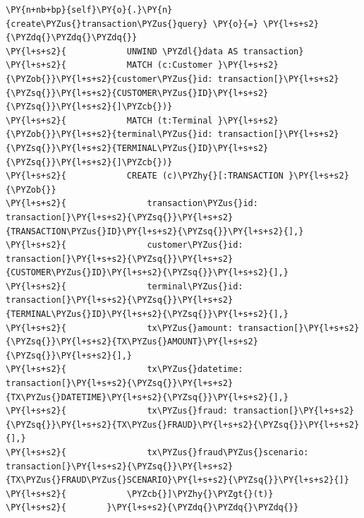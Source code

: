\begin{tcolorbox}[breakable, size=fbox, boxrule=1pt, pad at break*=1mm,colback=cellbackground, colframe=cellborder]
\begin{Verbatim}[commandchars=\\\{\}]
        \PY{n+nb+bp}{self}\PY{o}{.}\PY{n}{create\PYZus{}transaction\PYZus{}query} \PY{o}{=} \PY{l+s+s2}{\PYZdq{}\PYZdq{}\PYZdq{}}
\PY{l+s+s2}{            UNWIND \PYZdl{}data AS transaction}
\PY{l+s+s2}{            MATCH (c:Customer }\PY{l+s+s2}{\PYZob{}}\PY{l+s+s2}{customer\PYZus{}id: transaction[}\PY{l+s+s2}{\PYZsq{}}\PY{l+s+s2}{CUSTOMER\PYZus{}ID}\PY{l+s+s2}{\PYZsq{}}\PY{l+s+s2}{]\PYZcb{})}
\PY{l+s+s2}{            MATCH (t:Terminal }\PY{l+s+s2}{\PYZob{}}\PY{l+s+s2}{terminal\PYZus{}id: transaction[}\PY{l+s+s2}{\PYZsq{}}\PY{l+s+s2}{TERMINAL\PYZus{}ID}\PY{l+s+s2}{\PYZsq{}}\PY{l+s+s2}{]\PYZcb{})}
\PY{l+s+s2}{            CREATE (c)\PYZhy{}[:TRANSACTION }\PY{l+s+s2}{\PYZob{}}
\PY{l+s+s2}{                transaction\PYZus{}id: transaction[}\PY{l+s+s2}{\PYZsq{}}\PY{l+s+s2}{TRANSACTION\PYZus{}ID}\PY{l+s+s2}{\PYZsq{}}\PY{l+s+s2}{],}
\PY{l+s+s2}{                customer\PYZus{}id: transaction[}\PY{l+s+s2}{\PYZsq{}}\PY{l+s+s2}{CUSTOMER\PYZus{}ID}\PY{l+s+s2}{\PYZsq{}}\PY{l+s+s2}{],}
\PY{l+s+s2}{                terminal\PYZus{}id: transaction[}\PY{l+s+s2}{\PYZsq{}}\PY{l+s+s2}{TERMINAL\PYZus{}ID}\PY{l+s+s2}{\PYZsq{}}\PY{l+s+s2}{],}
\PY{l+s+s2}{                tx\PYZus{}amount: transaction[}\PY{l+s+s2}{\PYZsq{}}\PY{l+s+s2}{TX\PYZus{}AMOUNT}\PY{l+s+s2}{\PYZsq{}}\PY{l+s+s2}{],}
\PY{l+s+s2}{                tx\PYZus{}datetime: transaction[}\PY{l+s+s2}{\PYZsq{}}\PY{l+s+s2}{TX\PYZus{}DATETIME}\PY{l+s+s2}{\PYZsq{}}\PY{l+s+s2}{],}
\PY{l+s+s2}{                tx\PYZus{}fraud: transaction[}\PY{l+s+s2}{\PYZsq{}}\PY{l+s+s2}{TX\PYZus{}FRAUD}\PY{l+s+s2}{\PYZsq{}}\PY{l+s+s2}{],}
\PY{l+s+s2}{                tx\PYZus{}fraud\PYZus{}scenario: transaction[}\PY{l+s+s2}{\PYZsq{}}\PY{l+s+s2}{TX\PYZus{}FRAUD\PYZus{}SCENARIO}\PY{l+s+s2}{\PYZsq{}}\PY{l+s+s2}{]}
\PY{l+s+s2}{            \PYZcb{}]\PYZhy{}\PYZgt{}(t)}
\PY{l+s+s2}{        }\PY{l+s+s2}{\PYZdq{}\PYZdq{}\PYZdq{}}
        

\end{Verbatim}
\end{tcolorbox}
